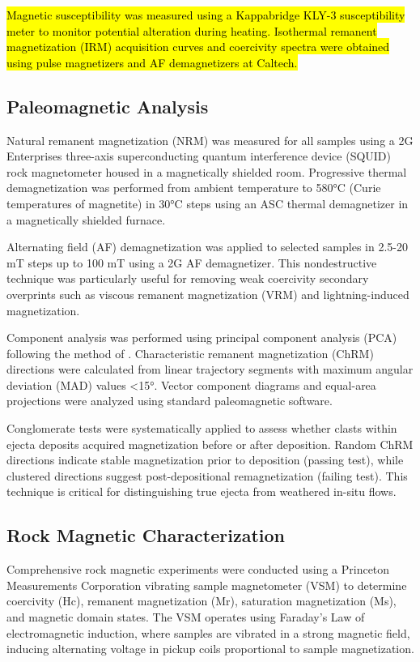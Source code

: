 \documentclass[twocolumn,11pt]{article}
\begin{document}
\hl{Magnetic susceptibility was measured using a Kappabridge KLY-3 susceptibility meter to monitor potential alteration during heating. Isothermal remanent magnetization (IRM) acquisition curves and coercivity spectra were obtained using pulse magnetizers and AF demagnetizers at Caltech.}

\subsection{Paleomagnetic Analysis}

Natural remanent magnetization (NRM) was measured for all samples using a 2G Enterprises three-axis superconducting quantum interference device (SQUID) rock magnetometer housed in a magnetically shielded room. Progressive thermal demagnetization was performed from ambient temperature to 580°C  (Curie temperatures of magnetite) in 30°C steps using an ASC thermal demagnetizer in a magnetically shielded furnace.

Alternating field (AF) demagnetization was applied to selected samples in 2.5-20 mT steps up to 100 mT using a 2G AF demagnetizer. This nondestructive technique was particularly useful for removing weak coercivity secondary overprints such as viscous remanent magnetization (VRM) and lightning-induced magnetization.

Component analysis was performed using principal component analysis (PCA) following the method of \citet{Kirschvink1980}. Characteristic remanent magnetization (ChRM) directions were calculated from linear trajectory segments with maximum angular deviation (MAD) values <15°. Vector component diagrams and equal-area projections were analyzed using standard paleomagnetic software.

Conglomerate tests were systematically applied to assess whether clasts within ejecta deposits acquired magnetization before or after deposition. Random ChRM directions indicate stable magnetization prior to deposition (passing test), while clustered directions suggest post-depositional remagnetization (failing test). This technique is critical for distinguishing true ejecta from weathered in-situ flows.

\subsection{Rock Magnetic Characterization}

Comprehensive rock magnetic experiments were conducted using a Princeton Measurements Corporation vibrating sample magnetometer (VSM) to determine coercivity (Hc), remanent magnetization (Mr), saturation magnetization (Ms), and magnetic domain states. The VSM operates using Faraday's Law of electromagnetic induction, where samples are vibrated in a strong magnetic field, inducing alternating voltage in pickup coils proportional to sample magnetization.
\end{document}
